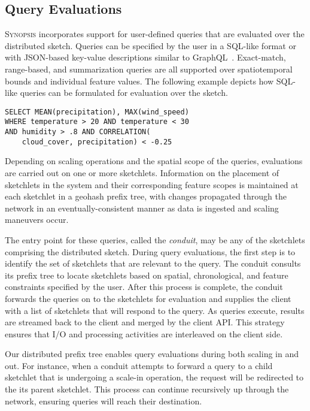 \subsection{Query Evaluations}
\label{subsec:query-eval}
\textsc{Synopsis} incorporates support for user-defined queries that are evaluated over the distributed sketch.  Queries can be specified by the user in a SQL-like format or with JSON-based key-value descriptions similar to GraphQL~\cite{graphql}. Exact-match, range-based, and summarization queries are all supported over spatiotemporal bounds and individual feature values. The following example depicts how SQL-like queries can be formulated for evaluation over the sketch.

\begin{Verbatim}[fontsize=\footnotesize]
SELECT MEAN(precipitation), MAX(wind_speed)
WHERE temperature > 20 AND temperature < 30
AND humidity > .8 AND CORRELATION(
    cloud_cover, precipitation) < -0.25
\end{Verbatim}

Depending on scaling operations and the spatial scope of the queries, evaluations are carried out on one or more sketchlets. Information on the placement of sketchlets in the system and their corresponding feature scopes is maintained at each sketchlet in a geohash prefix tree, with changes propagated through the network in an eventually-consistent manner as data is ingested and scaling maneuvers occur.

The entry point for these queries, called the \emph{conduit}, may be any of the sketchlets comprising the distributed sketch. During query evaluations, the first step is to identify the set of sketchlets that are relevant to the query. The conduit consults its prefix tree to locate sketchlets based on spatial, chronological, and feature constraints specified by the user. After this process is complete, the conduit forwards the queries on to the sketchlets for evaluation and supplies the client with a list of sketchlets that will respond to the query. As queries execute, results are streamed back to the client and merged by the client API. This strategy ensures that I/O and processing activities are interleaved on the client side.

Our distributed prefix tree enables query evaluations during both scaling in and out. For instance, when a conduit attempts to forward a query to a child sketchlet that is undergoing a scale-in operation, the request will be redirected to the its parent sketchlet. This process can continue recursively up through the network, ensuring queries will reach their destination.

